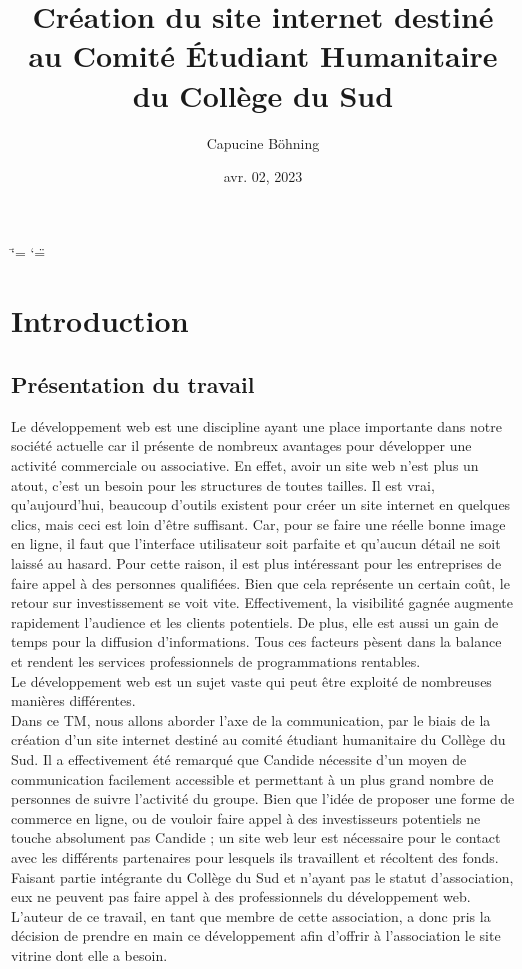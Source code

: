\documentclass[a4,10pt,french]{sphinxmanual}
\title{Création du site internet destiné au Comité Étudiant Humanitaire du Collège du Sud}
\date{avr. 02, 2023}
\author{Capucine Böhning}
\begin{document}
\ifdefined\shorthandoff
  \ifnum\catcode`\=\string=\active\shorthandoff{=}\fi
  \ifnum\catcode`\"=\active{}\fi
\fi

\pagestyle{empty}
\sphinxmaketitle
\pagestyle{plain}
\sphinxtableofcontents
\pagestyle{normal}
\label{\detokenize{index::doc}}



\chapter{Introduction}
\label{\detokenize{introduction:introduction}}\label{\detokenize{introduction::doc}}

\section{Présentation du travail}
\label{\detokenize{introduction:presentation-du-travail}}
\sphinxAtStartPar
Le développement web est une discipline ayant une place importante dans notre société actuelle car il présente de nombreux avantages pour développer une activité commerciale ou associative. En effet, avoir un site web n’est plus un atout, c’est un besoin pour les structures de toutes tailles. Il est vrai, qu’aujourd’hui, beaucoup d’outils existent pour créer un site internet en quelques clics, mais ceci est loin d’être suffisant. Car, pour se faire une réelle bonne image en ligne, il faut que l’interface utilisateur soit parfaite et qu’aucun détail ne soit laissé au hasard. Pour cette raison, il est plus intéressant pour les entreprises de faire appel à des personnes qualifiées. Bien que cela représente un certain coût, le retour sur investissement se voit vite. Effectivement, la visibilité gagnée augmente rapidement l’audience et les clients potentiels. De plus, elle est aussi un gain de temps pour la diffusion d’informations. Tous ces facteurs pèsent dans la balance et rendent les services professionnels de programmations rentables.\\
Le développement web est un sujet vaste qui peut être exploité de nombreuses manières différentes.\\
Dans ce TM, nous allons aborder l’axe de la communication, par le biais de la création d’un site internet destiné au comité étudiant humanitaire du Collège du Sud. Il a effectivement été remarqué que Candide nécessite d’un moyen de communication facilement accessible et permettant à un plus grand nombre de personnes de suivre l’activité du groupe. Bien que l’idée de proposer une forme de commerce en ligne, ou de vouloir faire appel à des investisseurs potentiels ne touche absolument pas Candide ; un site web leur est nécessaire pour le contact avec les différents partenaires pour lesquels ils travaillent et récoltent des fonds.\\
Faisant partie intégrante du Collège du Sud et n’ayant pas le statut d’association, eux ne peuvent pas faire appel à des professionnels du développement web. L’auteur de ce travail, en tant que membre de cette association, a donc pris la décision de prendre en main ce développement afin d’offrir à l’association le site vitrine dont elle a besoin.
\end{document}
